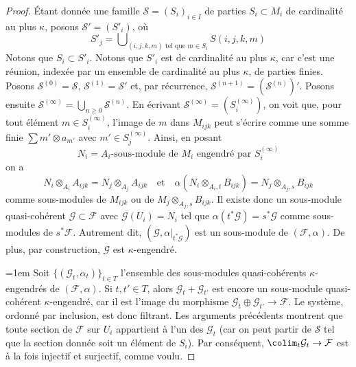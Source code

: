\begin{proof}
\medskip\noindent
Étant donnée une famille $\mathcal{S} = (S_i)_{i \in I}$ de parties
$S_i \subset M_i$ de cardinalité au plus $\kappa$, posons
$\mathcal{S}' = (S'_i)$, où
$$
S'_j = \bigcup\nolimits_{(i, j, k, m)\text{ tel que }m \in S_i}
S(i, j, k, m)
$$
Notons que $S_i \subset S'_i$. Notons que $S'_i$ est de cardinalité au plus
$\kappa$, car c'est une réunion, indexée par un ensemble de cardinalité au plus $\kappa$,
de parties finies. Posons $\mathcal{S}^{(0)} = \mathcal{S}$,
$\mathcal{S}^{(1)} = \mathcal{S}'$ et, par récurrence,
$\mathcal{S}^{(n + 1)} = (\mathcal{S}^{(n)})'$. Posons ensuite
$\mathcal{S}^{(\infty)} = \bigcup_{n \geq 0} \mathcal{S}^{(n)}$.
En écrivant $\mathcal{S}^{(\infty)} = (S^{(\infty)}_i)$, on voit que,
pour tout élément $m \in S^{(\infty)}_i$, l'image de $m$ dans
$M_{ijk}$ peut s'écrire comme une somme finie $\sum m' \otimes a_{m'}$
avec $m' \in S_j^{(\infty)}$. Ainsi, en posant
$$
N_i = A_i\text{-sous-module de }M_i\text{ engendré par }S^{(\infty)}_i
$$
on a
$$
N_i \otimes_{A_i} A_{ijk} = N_j \otimes_{A_j} A_{ijk}
\quad\text{et}\quad
\alpha(N_i \otimes_{A_i, t} B_{ijk}) = N_j \otimes_{A_j, s} B_{ijk}
$$
comme sous-modules de $M_{ijk}$ ou de $M_j \otimes_{A_j, s} B_{ijk}$.
Il existe donc un sous-module quasi-cohérent
$\mathcal{G} \subset \mathcal{F}$ avec $\mathcal{G}(U_i) = N_i$
tel que $\alpha(t^*\mathcal{G}) = s^*\mathcal{G}$ comme sous-modules
de $s^*\mathcal{F}$. Autrement dit,
$(\mathcal{G}, \alpha|_{t^*\mathcal{G}})$ est un sous-module de
$(\mathcal{F}, \alpha)$.
De plus, par construction, $\mathcal{G}$ est $\kappa$-engendré.

\medskip\noindent
{\emergencystretch=1em Soit $\{(\mathcal{G}_t, \alpha_t)\}_{t \in T}$ l'ensemble des
sous-modules quasi-cohérents $\kappa$-engendrés de $(\mathcal{F}, \alpha)$.
Si $t, t' \in T$, alors $\mathcal{G}_t + \mathcal{G}_{t'}$ est encore un
sous-module quasi-cohérent $\kappa$-engendré, car il est l'image du morphisme
$\mathcal{G}_t \oplus \mathcal{G}_{t'} \to \mathcal{F}$.
Le système, ordonné par inclusion, est donc filtrant.
Les arguments précédents montrent que toute section de $\mathcal{F}$ sur $U_i$
appartient à l'un des $\mathcal{G}_t$ (car on peut partir de $\mathcal{S}$
tel que la section donnée soit un élément de $S_i$). Par conséquent,
$\colim_t \mathcal{G}_t \to \mathcal{F}$ est à la fois injectif et surjectif,
comme voulu.\par}
\end{proof}





